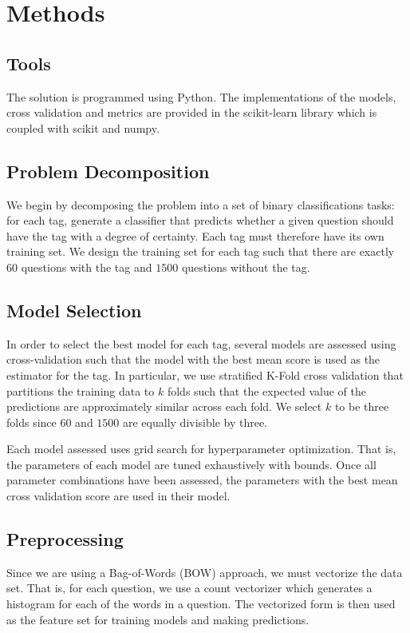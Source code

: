 \documentclass{sig-alternate}
\begin{document}

\section{Methods} %
\label{sec:Methods}
	\subsection{Tools} %
	\label{sub:Tools}
		The solution is programmed using Python. The implementations of the
		models, cross validation and metrics are provided in the scikit-learn
		library which is coupled with scikit and numpy.

	\subsection{Problem Decomposition} %
	\label{sub:Problem Decomposition}
		We begin by decomposing the problem into a set of binary
		classifications tasks: for each tag, generate a classifier that
		predicts whether a given question should have the tag with a degree
		of certainty. Each tag must therefore have its own training set. We
		design the training set for each tag such that there are exactly
		$60$ questions with the tag and $1500$ questions without the tag.

	\subsection{Model Selection} %
	\label{sub:Model Selection}
		In order to select the best model for each tag, several models are
		assessed using cross-validation such that the model with the best mean
		score is used as the estimator for the tag. In particular, we use
		stratified K-Fold cross validation that partitions the training data to
		$k$ folds such that the expected value of the predictions are
		approximately similar across each fold. We select $k$ to be three folds
		since $60$ and $1500$ are equally divisible by three.
	
		Each model assessed uses grid search for hyperparameter optimization.
		That is, the parameters of each model are tuned exhaustively with
		bounds. Once all parameter combinations have been assessed, the
		parameters with the best mean cross validation score are used in their
		model.

	\subsection{Preprocessing} %
	\label{sub:Preprocessing}
		Since we are using a Bag-of-Words (BOW) approach, we must vectorize the
		data set. That is, for each question, we use a count vectorizer which
		generates a histogram for each of the words in a question. The
		vectorized form is then used as the feature set for training models and
		making predictions.
\end{document}
